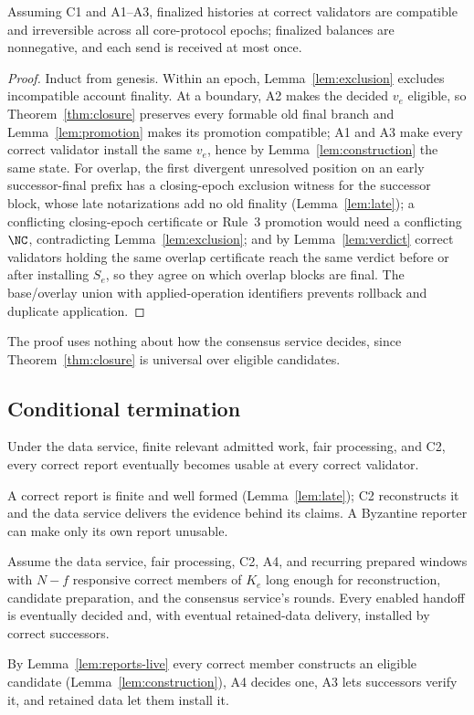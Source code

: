 \begin{theorem}
\label{thm:safety}
Assuming C1 and A1--A3, finalized histories at correct validators are compatible and irreversible across all core-protocol epochs; finalized balances are nonnegative, and each send is received at most once.
\end{theorem}
\begin{proof}
Induct from genesis. Within an epoch, Lemma~\ref{lem:exclusion} excludes incompatible account finality. At a boundary, A2 makes the decided $v_e$ eligible, so Theorem~\ref{thm:closure} preserves every formable old final branch and Lemma~\ref{lem:promotion} makes its promotion compatible; A1 and A3 make every correct validator install the same $v_e$, hence by Lemma~\ref{lem:construction} the same state. For overlap, the first divergent unresolved position on an early successor-final prefix has a closing-epoch exclusion witness for the successor block, whose late notarizations add no old finality (Lemma~\ref{lem:late}); a conflicting closing-epoch certificate or Rule~3 promotion would need a conflicting $\NC$, contradicting Lemma~\ref{lem:exclusion}; and by Lemma~\ref{lem:verdict} correct validators holding the same overlap certificate reach the same verdict before or after installing $S_e$, so they agree on which overlap blocks are final. The base/overlay union with applied-operation identifiers prevents rollback and duplicate application.
\end{proof}

The proof uses nothing about how the consensus service decides, since Theorem~\ref{thm:closure} is universal over eligible candidates.

\subsection{Conditional termination}
\begin{lemma}
\label{lem:reports-live}
Under the data service, finite relevant admitted work, fair processing, and C2, every correct report eventually becomes usable at every correct validator.
\end{lemma}
A correct report is finite and well formed (Lemma~\ref{lem:late}); C2 reconstructs it and the data service delivers the evidence behind its claims. A Byzantine reporter can make only its own report unusable.

\begin{theorem}
\label{thm:handoff-live}
Assume the data service, fair processing, C2, A4, and recurring prepared windows with $N-f$ responsive correct members of $K_e$ long enough for reconstruction, candidate preparation, and the consensus service's rounds. Every enabled handoff is eventually decided and, with eventual retained-data delivery, installed by correct successors.
\end{theorem}
By Lemma~\ref{lem:reports-live} every correct member constructs an eligible candidate (Lemma~\ref{lem:construction}), A4 decides one, A3 lets successors verify it, and retained data let them install it.


